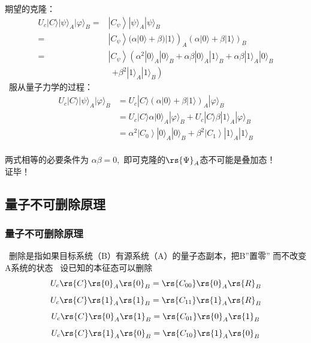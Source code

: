 \begin{frame}
    \frametitle{}
    期望的克隆：
    \[\begin{aligned}
        U_{c}|C\rangle|\psi\rangle_{A}|\varphi\rangle_{B}=&\left|C_{\psi}\right\rangle|\psi\rangle_{A}|\psi\rangle_{B} \\
        =&\left.\left|C_{\psi}\right\rangle(\alpha|0\rangle+\beta)|1\rangle\right)_{A}(\alpha|0\rangle+\beta|1\rangle)_{B} \\
        =&\left|C_{\psi}\right\rangle\left(\alpha^{2}|0\rangle_{A}|0\rangle_{B}+\alpha \beta|0\rangle_{A}|1\rangle_{B}+\alpha \beta|1\rangle_{A}|0\rangle_{B}\right.\\
        &~~\left.+\beta^{2}|1\rangle_{A}|1\rangle_{B}\right)
        \end{aligned} 
    \]
     服从量子力学的过程：
    \[ \begin{aligned}
        U_{c}|C\rangle|\psi\rangle_{A}|\varphi\rangle_{B} &=U_{c}|C\rangle\left(\alpha|0\rangle+\beta|1\rangle\right)_{A}|\varphi\rangle_{B} \\
        &=U_{c}|C\rangle \alpha|0\rangle_{A}|\varphi\rangle_{B}+U_{c}|C\rangle \beta|1\rangle_{A}|\varphi\rangle_{B} \\
        &=\alpha^{2}\left|C_{0}\right\rangle|0\rangle_{A}|0\rangle_{B}+\beta^{2}\left|C_{1}\right\rangle|1\rangle_{A}|1\rangle_{B}
        \end{aligned}
    \]
    ~~\\
    两式相等的必要条件为 $\alpha\beta=0$, 即可克隆的$\rs{\Psi}_A$态不可能是叠加态！\\
    证毕！          
\end{frame}

\subsection{量子不可删除原理}
\begin{frame}
    \frametitle{量子不可删除原理}
    {\Bullet}~删除是指如果目标系统（B）有源系统（A）的量子态副本，把B”置零” 而不改变A系统的状态
    \例[2.试证明未知量子态不可删除]{}
    \证~设已知的本征态可以删除
    \[ U_c\rs{C}\rs{0}_A\rs{0}_B=\rs{C_{00}}\rs{0}_A\rs{R}_B\]
    \[ U_c\rs{C}\rs{1}_A\rs{1}_B=\rs{C_{11}}\rs{1}_A\rs{R}_B\]
    \[ U_c\rs{C}\rs{0}_A\rs{1}_B=\rs{C_{01}}\rs{0}_A\rs{1}_B\]
    \[ U_c\rs{C}\rs{1}_A\rs{0}_B=\rs{C_{10}}\rs{1}_A\rs{0}_B\]
\end{frame}


